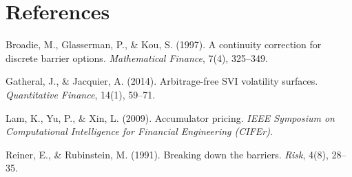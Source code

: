 \documentclass[11pt]{article}
\begin{document}
\section*{References}
\begin{list}{}{\setlength{\leftmargin}{1.6em}\setlength{\itemindent}{-1.6em}\setlength{\itemsep}{3pt}}
\item Broadie, M., Glasserman, P., \& Kou, S. (1997). A continuity correction for discrete barrier
      options. \emph{Mathematical Finance}, 7(4), 325--349.
\item Gatheral, J., \& Jacquier, A. (2014). Arbitrage-free SVI volatility surfaces.
      \emph{Quantitative Finance}, 14(1), 59--71.
\item Lam, K., Yu, P., \& Xin, L. (2009). Accumulator pricing. \emph{IEEE Symposium on
      Computational Intelligence for Financial Engineering (CIFEr)}.
\item Reiner, E., \& Rubinstein, M. (1991). Breaking down the barriers. \emph{Risk}, 4(8), 28--35.
\end{list}
\end{document}
